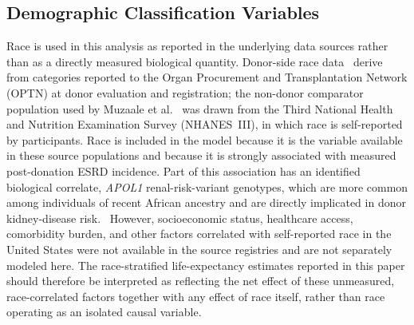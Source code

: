 \subsection*{Demographic Classification Variables}
Race is used in this analysis as reported in the underlying data sources rather than as a directly measured biological quantity. Donor-side race data~\cite{muzaale_risk_2014,massie_quantifying_2017,srtr_2023,usrds_2024,usrds_2025} derive from categories reported to the Organ Procurement and Transplantation Network (OPTN) at donor evaluation and registration; the non-donor comparator population used by Muzaale et al.~\cite{muzaale_risk_2014} was drawn from the Third National Health and Nutrition Examination Survey (NHANES~III), in which race is self-reported by participants. Race is included in the model because it is the variable available in these source populations and because it is strongly associated with measured post-donation ESRD incidence. Part of this association has an identified biological correlate, \textit{APOL1} renal-risk-variant genotypes, which are more common among individuals of recent African ancestry and are directly implicated in donor kidney-disease risk.~\cite{blackfolks} However, socioeconomic status, healthcare access, comorbidity burden, and other factors correlated with self-reported race in the United States were not available in the source registries and are not separately modeled here. The race-stratified life-expectancy estimates reported in this paper should therefore be interpreted as reflecting the net effect of these unmeasured, race-correlated factors together with any effect of race itself, rather than race operating as an isolated causal variable.
